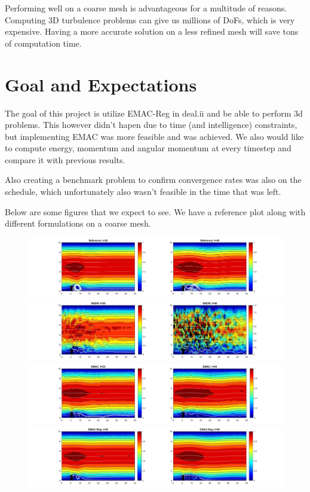 \documentclass[12pt]{article}
\numberwithin{equation}{section}
\begin{document}
Performing well on a coarse mesh is advantageous for a multitude of reasons.  Computing 3D turbulence problems can give us millions of DoFs, which is very expensive.  Having a more accurate solution on a less refined mesh will save tons of computation time.

\section{Goal and Expectations}

The goal of this project is utilize EMAC-Reg in deal.ii and be able to perform 3d problems.  This however didn't hapen due to time (and intelligence) constraints, but implementing EMAC was more feasible and was achieved.  We also would like to compute energy, momentum and angular momentum at every timestep and compare it with previous results.

Also creating a benchmark problem to confirm convergence rates was also on the schedule, which unfortunately also wasn't feasible in the time that was left.

Below are some figures that we expect to see.  We have a reference plot along with different formulations on a coarse mesh.
\begin{figure}[H]
\centering
\includegraphics[scale=.25]{step_Skew_fine.jpg}
\includegraphics[scale=.25]{step_skew_coarse.jpg}
\includegraphics[scale=.25]{step_EMAC_coarse.jpg}
\includegraphics[scale=.25]{step_EMAC_Reg_coarse.jpg}
\end{figure}
\end{document}
